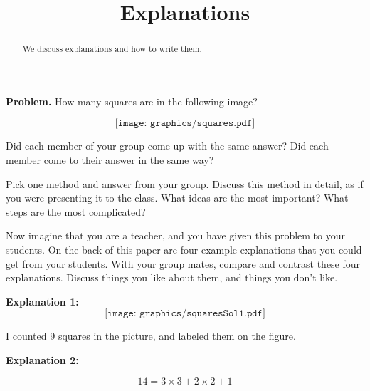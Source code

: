 \documentclass[nooutcomes, handout]{ximera}
\title{Explanations}
\begin{document}
\begin{abstract}
    We discuss explanations and how to write them.
\end{abstract}
\maketitle

{\bf Problem.} How many squares are in the following image?

\[
\texttt{[image: graphics/squares.pdf]}
\]


\begin{question}
Did each member of your group come up with the same answer?  Did each member come to their answer in the same way?
\end{question}



\begin{question}
Pick one method and answer from your group.  Discuss this method in detail, as if you were presenting it to the class.  What ideas are the most important?  What steps are the most complicated?
\end{question}


\begin{question}
Now imagine that you are a teacher, and you have given this problem to your students.  On the back of this paper are four example explanations that you could get from your students.  With your group mates, compare and contrast these four explanations.  Discuss things you like about them, and things you don't like.
\end{question}

\pagebreak
\parbox{2.5in}{
\begin{mdframed}

{\bf Explanation 1:}
\[
\texttt{[image: graphics/squaresSol1.pdf]}
\]

I counted 9 squares in the picture, and labeled them on the figure.

\end{mdframed}}
\parbox{2in}{
\begin{mdframed}
{\bf Explanation 2:}

$$ 14 = 3\times 3 + 2\times 2 + 1 $$


\end{mdframed}}
\end{document}

